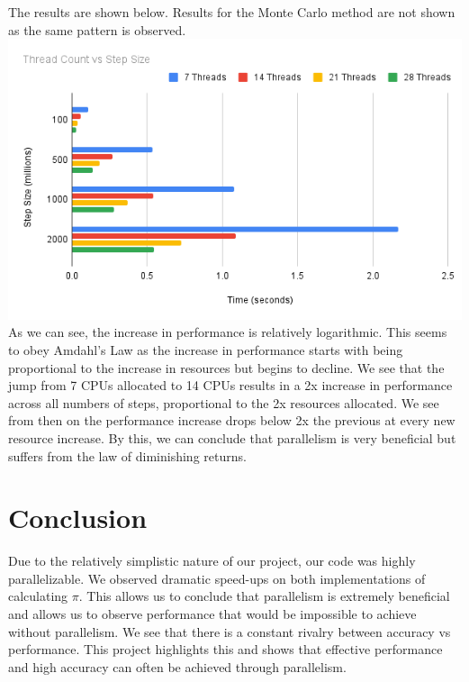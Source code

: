 \documentclass{article}
\begin{document}
\begin{multicols}{2}
The results are shown below. Results for the Monte Carlo method are not shown as the same pattern is observed.
\includegraphics[width=\linewidth]{Images/chart.png}
As we can see, the increase in performance is relatively logarithmic. This seems to obey Amdahl's Law as the increase in performance starts with being proportional to the increase in resources but begins to decline. We see that the jump from 7 CPUs allocated to 14 CPUs results in a 2x increase in performance across all numbers of steps, proportional to the 2x resources allocated. We see from then on the performance increase drops below 2x the previous at every new resource increase. By this, we can conclude that parallelism is very beneficial but suffers from the law of diminishing returns.

\section{Conclusion}
Due to the relatively simplistic nature of our project, our code was highly parallelizable. We observed dramatic speed-ups on both implementations of calculating $\pi$. This allows us to conclude that parallelism is extremely beneficial and allows us to observe performance that would be impossible to achieve without parallelism. We see that there is a constant rivalry between accuracy vs performance. This project highlights this and shows that effective performance and high accuracy can often be achieved through parallelism.


\end{multicols}
\end{document}
